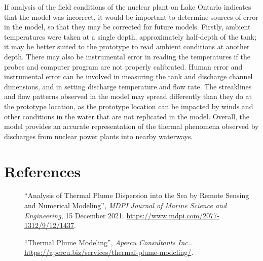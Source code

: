 \documentclass{article}
\begin{document}
\par If analysis of the field conditions of the nuclear plant on Lake Ontario indicates that the model was incorrect, it would be important to determine sources of error in the model, so that they may be corrected for future models. Firstly, ambient temperatures were taken at a single depth, approximately half-depth of the tank; it may be better suited to the prototype to read ambient conditions at another depth. There may also be instrumental error in reading the temperatures if the probes and computer program are not properly calibrated. Human error and instrumental error can be involved in measuring the tank and discharge channel dimensions, and in setting discharge temperature and flow rate. The streaklines and flow patterns observed in the model may spread differently than they do at the prototype location, as the prototype location can be impacted by winds and other conditions in the water that are not replicated in the model. Overall, the model provides an accurate representation of the thermal phenomena observed by discharges from nuclear power plants into nearby waterways.  
\newpage
\section{References}

\begin{description}
    \item[] ``Analysis of Thermal Plume Dispersion into the Sea by Remote Sensing and Numerical Modeling'', \emph{MDPI Journal of Marine Science and Engineering}, 15 December 2021. \url{https://www.mdpi.com/2077-1312/9/12/1437}.
    \item[] ``Thermal Plume Modeling'', \emph{Apercu Consultants Inc.}. \url{https://apercu.biz/services/thermal-plume-modeling/}.
\end{description}
\end{document}
